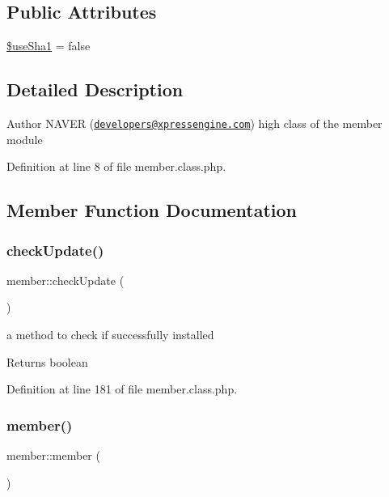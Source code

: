 \subsection*{Public Attributes}
\begin{DoxyCompactItemize}
\item 
\hyperlink{classmember_ac0b029db59512728210f8b61dbab59f7}{\$use\+Sha1} = false
\end{DoxyCompactItemize}


\subsection{Detailed Description}
\begin{DoxyAuthor}{Author}
N\+A\+V\+ER (\href{mailto:developers@xpressengine.com}{\tt developers@xpressengine.\+com}) high class of the member module 
\end{DoxyAuthor}


Definition at line 8 of file member.\+class.\+php.



\subsection{Member Function Documentation}
\mbox{\label{classmember_ad28f96bfab17efa94a9f2607a8b42a3d}} 
\subsubsection{\texorpdfstring{check\+Update()}{checkUpdate()}}
{\footnotesize\ttfamily member\+::check\+Update (\begin{DoxyParamCaption}{ }\end{DoxyParamCaption})}

a method to check if successfully installed

\begin{DoxyReturn}{Returns}
boolean 
\end{DoxyReturn}


Definition at line 181 of file member.\+class.\+php.

\mbox{\label{classmember_a4153f13605eac8adf8dde89ee7d18c02}} 
\subsubsection{\texorpdfstring{member()}{member()}}
{\footnotesize\ttfamily member\+::member (\begin{DoxyParamCaption}{ }\end{DoxyParamCaption})}

